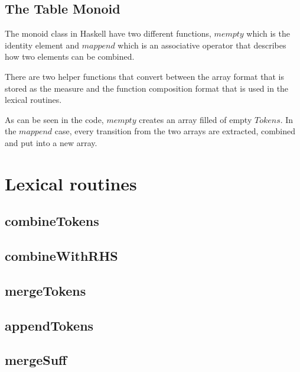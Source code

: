 \subsection{The Table Monoid}
The monoid class in Haskell have two different functions, $mempty$ which is the
identity element and $mappend$ which is an associative operator that describes how
two elements can be combined.

There are two helper functions that convert between the array format that is
stored as the measure and the function composition format that is used in the
lexical routines.

As can be seen in the code, $mempty$ creates an array filled of empty $Tokens$.
In the $mappend$ case, every transition from the two arrays are extracted,
combined and put into a new array.

\section{Lexical routines}
\subsection{combineTokens}
\subsection{combineWithRHS}
\subsection{mergeTokens}
\subsection{appendTokens}
\subsection{mergeSuff}
